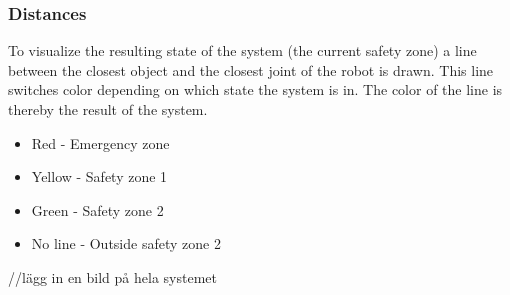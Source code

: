 \subsubsection{Distances}
To visualize the resulting state of the system (the current safety zone) a line between the closest object and the closest joint of the robot is drawn. This line switches color depending on which state the system is in. The color of the line is thereby the result of the system. 

\begin{itemize}
  \item Red - Emergency zone
  \item Yellow - Safety zone 1 
  \item Green - Safety zone 2
  \item No line - Outside safety zone 2 
\end{itemize}

//lägg in en bild på hela systemet

